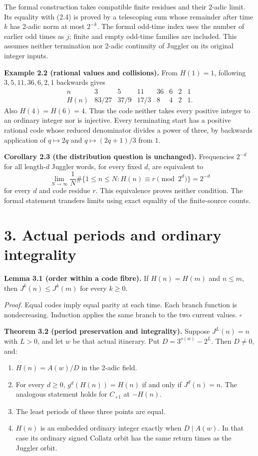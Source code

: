 \documentclass[11pt,a4paper]{article}
\providecommand{\tightlist}{\setlength{\itemsep}{0pt}\setlength{\parskip}{0pt}}
\begin{document}
The formal construction takes compatible finite residues and their
2-adic limit. Its equality with (2.4) is proved by a telescoping sum
whose remainder after time \(k\) has 2-adic norm at most \(2^{-k}\). The
formal odd-time index uses the number of earlier odd times as \(j\);
finite and empty odd-time families are included. This assumes neither
termination nor 2-adic continuity of Juggler on its original integer
inputs.

\textbf{Example 2.2 (rational values and collisions).} From \(H(1)=1\),
following \(3,5,11,36,6,2,1\) backwards gives \[
\begin{array}{c|rrrrrrr}
n&3&5&11&36&6&2&1\\ \hline
H(n)&83/27&37/9&17/3&8&4&2&1.
\end{array}
\] Also \(H(4)=H(6)=4\). Thus the code neither takes every positive
integer to an ordinary integer nor is injective. Every terminating start
has a positive rational code whose reduced denominator divides a power
of three, by backwards application of \(q\mapsto2q\) and
\(q\mapsto(2q+1)/3\) from \(1\).

\textbf{Corollary 2.3 (the distribution question is unchanged).}
Frequencies \(2^{-d}\) for all length-\(d\) Juggler words, for every
fixed \(d\), are equivalent to \[
\lim_{N\to\infty}\frac1N
\#\{1\le n\le N:H(n)\equiv r\pmod{2^d}\}=2^{-d}
\] for every \(d\) and code residue \(r\). This equivalence proves
neither condition. The formal statement transfers limits using exact
equality of the finite-source counts.

\section{3. Actual periods and ordinary
integrality}\label{actual-periods-and-ordinary-integrality}

\textbf{Lemma 3.1 (order within a code fibre).} If \(H(n)=H(m)\) and
\(n\le m\), then \(J^k(n)\le J^k(m)\) for every \(k\ge0\).

\emph{Proof.} Equal codes imply equal parity at each time. Each branch
function is nondecreasing. Induction applies the same branch to the two
current values. \(\square\)

\textbf{Theorem 3.2 (period preservation and integrality).} Suppose
\(J^L(n)=n\) with \(L>0\), and let \(w\) be that actual itinerary. Put
\(D=3^{o(w)}-2^L\). Then \(D\ne0\), and:

\begin{enumerate}
\def\labelenumi{\arabic{enumi}.}
\tightlist
\item
  \(H(n)=A(w)/D\) in the 2-adic field.
\item
  For every \(d\ge0\), \(g^d(H(n))=H(n)\) if and only if \(J^d(n)=n\).
  The analogous statement holds for \(C_{+1}\) at \(-H(n)\).
\item
  The least periods of these three points are equal.
\item
  \(H(n)\) is an embedded ordinary integer exactly when \(D\mid A(w)\).
  In that case its ordinary signed Collatz orbit has the same return
  times as the Juggler orbit.
\end{enumerate}
\end{document}
